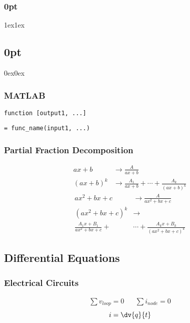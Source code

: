 \documentclass{article}
\begin{document}
\titlespacing*\subsubsection{0pt}{1ex}{1ex}
\titlespacing*\subsection{0pt}{0ex}{0ex}

\setlength{\abovecaptionskip}{-5pt}
\setlength{\textfloatsep}{0pt}

\setlength{\abovedisplayskip}{1pt}
\setlength{\belowdisplayskip}{1pt}

\begin{multicols}{3}
    \subsubsection*{MATLAB}
    \lstinline!function [output1, ...]!

    \mbox{}\hfill\lstinline!= func_name(input1, ...)!
    \subsubsection*{Partial Fraction Decomposition}
    \begin{align*}
        ax+b                & \to \frac{A}{ax+b}                                                \\
        \left(ax+b\right)^k & \to \frac{A_1}{ax+b} + \cdots + \frac{A_k}{\left( ax+b \right)^k}
    \end{align*}
    \begin{align*}
        ax^2+bx+c                    & \to \frac{A}{ax^2+bx+c}                              \\
        \left(ax^2+bx+c\right)^k     & \to                                                  \\
        \frac{A_1x+B_1}{ax^2+bx+c} + & \cdots + \frac{A_kx+B_k}{\left( ax^2+bx+c \right)^k}
    \end{align*}
    \subsection*{Differential Equations}
    \subsubsection*{Electrical Circuits}
    \begin{align*}
        \sum v_{loop} = 0 &  & \sum i_{node} = 0
    \end{align*}
    \begin{equation*}
        \displaystyle i = \dv{q}{t}
    \end{equation*}

\end{multicols}
\end{document}
